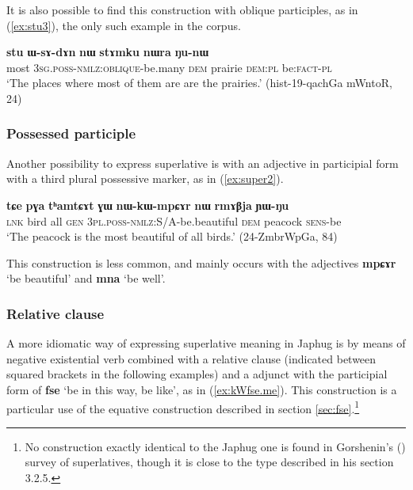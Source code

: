\documentclass[oneside,a4paper,11pt]{article}
\newcommand{\ipa}[1]{{\phon\textbf{#1}}} %
\newcommand{\forme}[2]{\ipa{#1} `#2'}
\begin{document}
It is also possible to find this construction with oblique participles, as in (\ref{ex:stu3}), the only such example in the corpus.

\begin{exe}
\ex \label{ex:stu3}
\gll 
\ipa{stu} 	\ipa{ɯ-sɤ-dɤn} 	\ipa{nɯ} 	\ipa{stɤmku} 	\ipa{nɯra} 	\ipa{ŋu-nɯ} \\
most \textsc{3sg.poss-nmlz:oblique}-be.many \textsc{dem} prairie \textsc{dem:pl} be:\textsc{fact-pl} \\
\glt `The places where most of them are are the prairies.' (hist-19-qachGa mWntoR, 24)
\end{exe}

 \subsubsection{Possessed participle}
Another possibility to express superlative is with an adjective in participial form  with a third plural possessive marker, as in (\ref{ex:super2}). 
 
 \begin{exe}
\ex \label{ex:super2}
\gll 
\ipa{tɕe} 	\ipa{pɣa} 	\ipa{tʰamtɕɤt} 	\ipa{ɣɯ} 	\ipa{nɯ-kɯ-mpɕɤr} 	\ipa{nɯ} 	\ipa{rmɤβja} 	\ipa{ɲɯ-ŋu} \\
\textsc{lnk} bird all \textsc{gen} \textsc{3pl.poss-nmlz}:S/A-be.beautiful \textsc{dem} peacock \textsc{sens}-be \\
\glt  `The peacock is the most beautiful of all birds.' (24-ZmbrWpGa, 84)
\end{exe}

This construction is less common, and mainly occurs with the adjectives \forme{mpɕɤr}{be beautiful} and \forme{mna}{be well}.

 \subsubsection{Relative clause} \label{sec:relative.superlative}
 A more idiomatic way of expressing superlative meaning in Japhug is by means of negative existential verb combined with a relative clause (indicated between squared brackets in the following examples) and a adjunct with the participial form of \forme{fse}{be in this way, be like}, as in (\ref{ex:kWfse.me}). This construction is a particular use of the equative construction described in section \ref{sec:fse}.\footnote{No construction exactly identical to the Japhug one is found in Gorshenin's (\citeyear{gorshenin12superlative}) survey of superlatives, though it is close to the type described in his section 3.2.5.}
 
\end{document}
